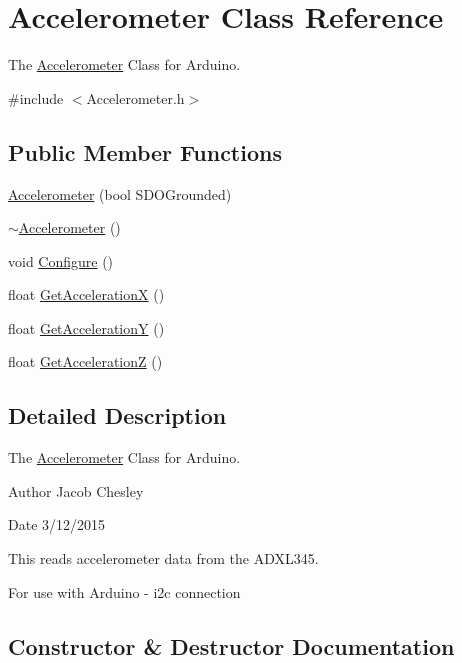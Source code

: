 \hypertarget{class_accelerometer}{}\section{Accelerometer Class Reference}
\label{class_accelerometer}


The \hyperlink{class_accelerometer}{Accelerometer} Class for Arduino.  




{\ttfamily \#include $<$Accelerometer.\+h$>$}

\subsection*{Public Member Functions}
\begin{DoxyCompactItemize}
\item 
\hyperlink{class_accelerometer_a50ec57a910eb642364bbb57cc9839d86}{Accelerometer} (bool S\+D\+O\+Grounded)
\item 
\hyperlink{class_accelerometer_acb6a7d9c61f2084ec4aec4a8ff35d622}{$\sim$\+Accelerometer} ()
\item 
void \hyperlink{class_accelerometer_a159b195c4cc4d58a4727737f9036eb73}{Configure} ()
\item 
float \hyperlink{class_accelerometer_a295cc8188bb3bc91cbc8539929e089ca}{Get\+Acceleration\+X} ()
\item 
float \hyperlink{class_accelerometer_af9250dceaab6ce6242bc351f619d2667}{Get\+Acceleration\+Y} ()
\item 
float \hyperlink{class_accelerometer_aa60461fbdcb7e10af959a225016b5c91}{Get\+Acceleration\+Z} ()
\end{DoxyCompactItemize}


\subsection{Detailed Description}
The \hyperlink{class_accelerometer}{Accelerometer} Class for Arduino. 

\begin{DoxyAuthor}{Author}
Jacob Chesley 
\end{DoxyAuthor}
\begin{DoxyDate}{Date}
3/12/2015
\end{DoxyDate}
This reads accelerometer data from the A\+D\+X\+L345.

For use with Arduino -\/ i2c connection 

\subsection{Constructor \& Destructor Documentation}
\hypertarget{class_accelerometer_a50ec57a910eb642364bbb57cc9839d86}{}
